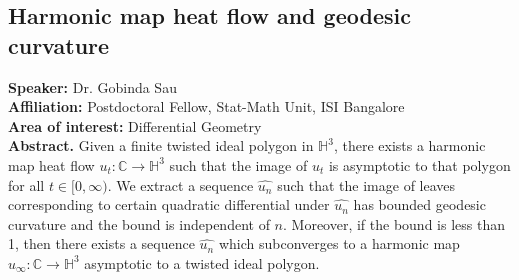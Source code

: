 \subsection*{Harmonic map heat flow and geodesic curvature} %
\noindent
\textbf{Speaker:} Dr. Gobinda Sau \\ %
\textbf{Affiliation:} Postdoctoral Fellow, Stat-Math Unit, ISI Bangalore \\ %
\textbf{Area of interest:} Differential Geometry \\

\noindent\textbf{Abstract.} Given a finite twisted ideal polygon in \(\mathbb{H}^3\), there exists a harmonic
map heat flow \(u_t : \mathbb{C} \to \mathbb{H}^3\) such that the image of \(u_t\) is asymptotic to that
polygon for all \(t \in [0, \infty)\). We extract a sequence \(\hat{u_n}\) such that the image
of leaves corresponding to certain quadratic differential under \(\hat{u_n}\) has bounded
geodesic curvature and the bound is independent of \(n\). Moreover, if the bound
is less than 1, then there exists a sequence \(\hat{u_n}\) which subconverges to a harmonic
map \(\hat{u}_\infty : \mathbb{C} \to \mathbb{H}^3\)  asymptotic to a twisted ideal polygon.

